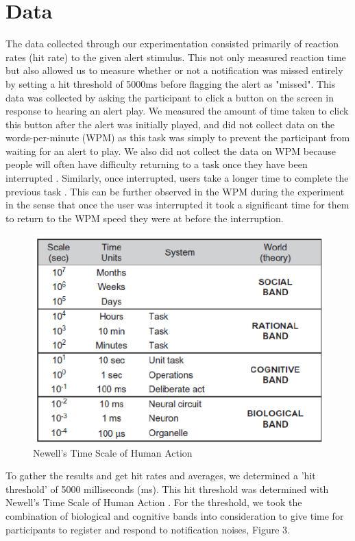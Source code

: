 \documentclass[manuscript,screen,review]{acmart}
\begin{document}
\section{Data}
The data collected through our experimentation consisted primarily of reaction rates (hit rate) to the given alert stimulus. This not only measured reaction time but also allowed us to measure whether or not a notification was missed entirely by setting a hit threshold of 5000ms before flagging the alert as "missed". This data was collected by asking the participant to click a button on the screen in response to hearing an alert play. We measured the amount of time taken to click this button after the alert was initially played, and did not collect data on the words-per-minute (WPM) as this task was simply to prevent the participant from waiting for an alert to play. We also did not collect the data on WPM because people will often have difficulty returning to a task once they have been interrupted \cite{horvitz2001notification}. Similarly, once interrupted, users take a longer time to complete the previous task \cite{leiva2012back}. This can be further observed in the WPM during the experiment in the sense that once the user was interrupted it took a significant time for them to return to the WPM speed they were at before the interruption.

\begin{figure}[h]
  \includegraphics[scale=0.5]{images/Newells-Time-Scale.png}
  \caption{Newell's Time Scale of Human Action}
\end{figure}

To gather the results and get hit rates and averages, we determined a 'hit threshold' of 5000 milliseconds (ms). This hit threshold was determined with Newell's Time Scale of Human Action \cite{newell1994unified}. For the threshold, we took the combination of biological and cognitive bands into consideration to give time for participants to register and respond to notification noises, Figure 3.
\end{document}

